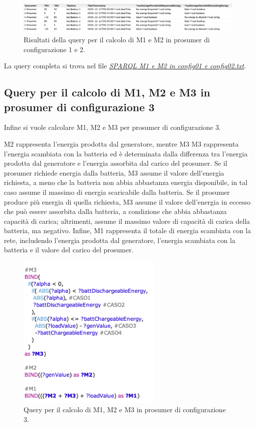 \begin{figure}[H]
    \centering
    \includegraphics[width=15cm]{images/query_m1m2_config0102_res.png}
    \caption{Risultati della query per il calcolo di M1 e M2 in prosumer di configurazione 1 e 2.}
    \label{fig:query_m1_m2_res}
\end{figure}

La query completa si trova nel file \href{https://github.com/19eddie/SemanticWeb-Assignment02-03/blob/main/SPARQL%20M1%20e%20M2%20in%20config01%20e%20config02.txt}{\textit{SPARQL M1 e M2 in config01 e config02.txt}}.

\subsection{Query per il calcolo di M1, M2 e M3 in prosumer di configurazione 3}

Infine si vuole calcolare M1, M2 e M3 per prosumer di configurazione 3.

M2 rappresenta l'energia prodotta dal generatore, mentre M3 M3 rappresenta l'energia scambiata con la batteria ed è determinata dalla differenza tra l'energia prodotta dal generatore e l'energia assorbita dal carico del prosumer.
Se il prosumer richiede energia dalla batteria, M3 assume il valore dell'energia richiesta, a meno che la batteria non abbia abbastanza energia disponibile, in tal caso assume il massimo di energia scaricabile dalla batteria. Se il prosumer produce più energia di quella richiesta,
M3 assume il valore dell'energia in eccesso che può essere assorbita dalla batteria, a condizione che abbia abbastanza capacità di carica; altrimenti, assume il massimo valore di capacità di carica della batteria, ma negativo.
Infine, M1 rappresenta il totale di energia scambiata con la rete, includendo l'energia prodotta dal generatore, l'energia scambiata con la batteria e il valore del carico del prosumer.

\begin{figure}[H]
    \centering
    \includegraphics[width=7cm]{images/query_m3.png}
    \caption{Query per il calcolo di M1, M2 e M3 in prosumer di configurazione 3.}
    \label{fig:query_m3}
\end{figure}


